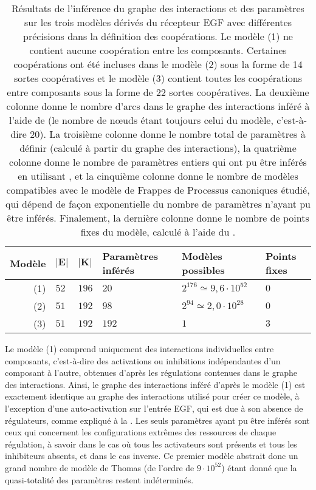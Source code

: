 \begin{table}[ht]
  \ZifferAn
  \begin{center}
  \begin{tabular}{r|l|l|l|l|l} %
    \textbf{Modèle} & $\mathbf{|E|}$ & $\mathbf{|K|}$ & \textbf{Paramètres inférés} &
      \textbf{Modèles possibles} & \textbf{Points fixes}
  \\\hline\hline
    (1) & $52$ & $196$ & $20$ & $2^{176}\simeq 9,6\cdot10^{52}$ & $0$   %
  \\\hline
    (2) & $51$ & $192$ & $98$ & $2^{94}\simeq 2,0\cdot10^{28}$ & $0$    %
  \\\hline
    (3) & $51$ & $192$ & $192$ & $1$ & $3$                              %
  \\\hline
  \end{tabular}
  \end{center}
  \caption{%
    Résultats de l'inférence du graphe des interactions et des paramètres
    sur les trois modèles dérivés du récepteur EGF %
    avec différentes précisions dans la définition des coopérations.
    Le modèle (1) ne contient aucune coopération entre les composants.
    Certaines coopérations ont été incluses dans le modèle (2) sous la forme de 14
    sortes coopératives et le modèle (3) contient toutes les coopérations entre composants
    sous la forme de 22 sortes coopératives.
    La deuxième colonne donne le nombre d'arcs dans le graphe des interactions inféré
    à l'aide de \storef (le nombre de nœuds étant toujours celui du modèle, c'est-à-dire 20).
    La troisième colonne donne le nombre total de paramètres à définir
    (calculé à partir du graphe des interactions),
    la quatrième colonne donne le nombre de paramètres entiers qui ont pu être inférés
    en utilisant \storef,
    et la cinquième colonne donne le nombre de modèles compatibles avec le modèle
    de Frappes de Processus canoniques étudié,
    qui dépend de façon exponentielle du nombre de paramètres n'ayant pu être inférés.
    Finalement, la dernière colonne donne le nombre de points fixes du modèle,
    calculé à l'aide du .
  }
  \ZifferAus
\end{table}


Le modèle (1) comprend uniquement des interactions individuelles entre composants,
c'est-à-dire des activations ou inhibitions indépendantes d'un composant à l'autre,
obtenues d'après les régulations contenues dans le graphe des interactions.
Ainsi, le graphe des interactions inféré d'après le modèle (1) est exactement identique
au graphe des interactions utilisé pour créer ce modèle,
à l'exception d'une auto-activation sur l'entrée EGF,
qui est due à son absence de régulateurs,
comme expliqué à la .
Les seuls paramètres ayant pu être inférés sont ceux qui concernent les configurations extrêmes
des ressources de chaque régulation,
à savoir dans le cas où tous les activateurs sont présents et tous les inhibiteurs absents,
et dans le cas inverse.
Ce premier modèle abstrait donc un grand nombre de modèle de Thomas
(de l'ordre de $9\cdot10^{52}$)
étant donné que la quasi-totalité des paramètres restent indéterminés.

